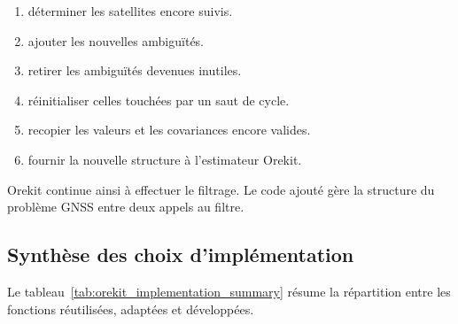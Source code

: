 \begin{enumerate}
    \item déterminer les satellites encore suivis.
    \item ajouter les nouvelles ambiguïtés.
    \item retirer les ambiguïtés devenues inutiles.
    \item réinitialiser celles touchées par un saut de cycle.
    \item recopier les valeurs et les covariances encore valides.
    \item fournir la nouvelle structure à l'estimateur Orekit.
\end{enumerate}

Orekit continue ainsi à effectuer le filtrage. Le code ajouté gère la structure
du problème GNSS entre deux appels au filtre.

\subsection{Synthèse des choix d'implémentation}

Le tableau~\ref{tab:orekit_implementation_summary} résume la répartition entre
les fonctions réutilisées, adaptées et développées.

